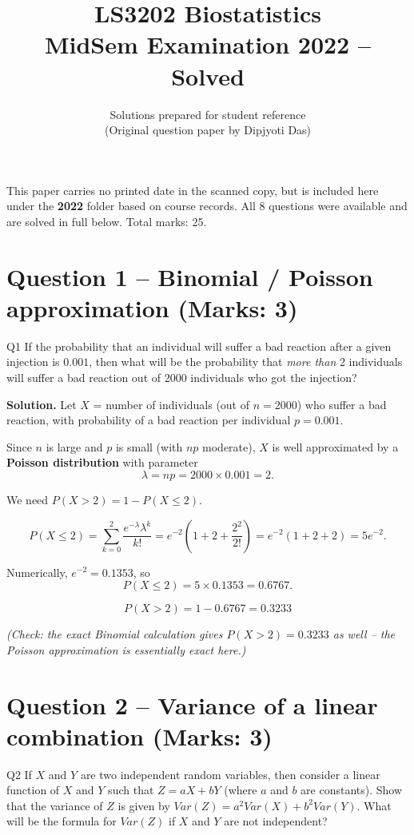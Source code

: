 \documentclass[11pt]{article}
\title{\textbf{LS3202 Biostatistics \\ MidSem Examination 2022 -- Solved}}
\author{Solutions prepared for student reference \\ \small (Original question paper by Dipjyoti Das)}
\date{}
\newcommand{\soln}{\par\noindent\textcolor{acolor}{\textbf{Solution.}}\quad}
\begin{document}
\maketitle

\begin{tcolorbox}[colback=notecolor!8, colframe=notecolor, title=Note on this paper]
This paper carries no printed date in the scanned copy, but is included here under the \textbf{2022} folder based on course records. All 8 questions were available and are solved in full below. Total marks: 25.
\end{tcolorbox}

\tableofcontents
\vspace{1em}

\section{Question 1 -- Binomial / Poisson approximation (Marks: 3)}
\begin{question}{Q1}
If the probability that an individual will suffer a bad reaction after a given injection is $0.001$, then what will be the probability that \emph{more than} 2 individuals will suffer a bad reaction out of 2000 individuals who got the injection?
\end{question}

\soln
Let $X$ = number of individuals (out of $n=2000$) who suffer a bad reaction, with probability of a bad reaction per individual $p = 0.001$.

Since $n$ is large and $p$ is small (with $np$ moderate), $X$ is well approximated by a \textbf{Poisson distribution} with parameter
\[
\lambda = np = 2000 \times 0.001 = 2.
\]

We need $P(X > 2) = 1 - P(X \le 2)$.

\[
P(X \le 2) = \sum_{k=0}^{2} \frac{e^{-\lambda}\lambda^k}{k!}
= e^{-2}\left(1 + 2 + \frac{2^2}{2!}\right)
= e^{-2}(1+2+2) = 5e^{-2}.
\]

Numerically, $e^{-2} = 0.1353$, so
\[
P(X \le 2) = 5 \times 0.1353 = 0.6767.
\]

\[
\boxed{P(X>2) = 1 - 0.6767 = 0.3233}
\]

\textit{(Check: the exact Binomial calculation gives $P(X>2) = 0.3233$ as well -- the Poisson approximation is essentially exact here.)}

\section{Question 2 -- Variance of a linear combination (Marks: 3)}
\begin{question}{Q2}
If $X$ and $Y$ are two independent random variables, then consider a linear function of $X$ and $Y$ such that $Z = aX + bY$ (where $a$ and $b$ are constants). Show that the variance of $Z$ is given by $Var(Z) = a^2 Var(X) + b^2 Var(Y)$. What will be the formula for $Var(Z)$ if $X$ and $Y$ are not independent?
\end{question}
\end{document}
